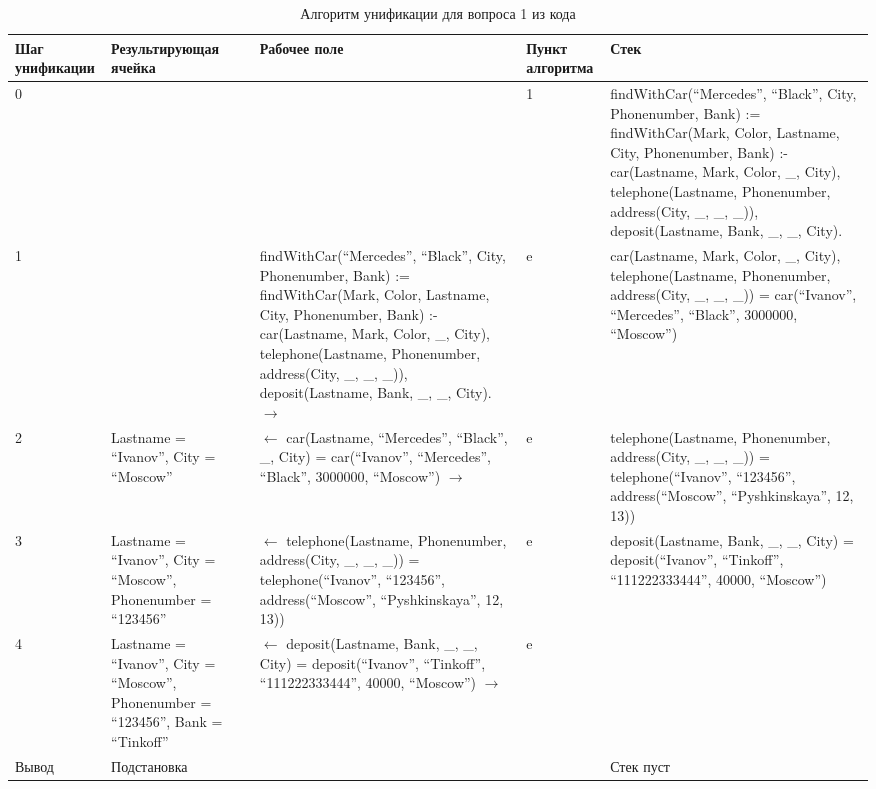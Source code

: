 {
\small
\begin{longtable}{|p{1.15cm}|p{2.5cm}|p{5cm}|p{1cm}|p{7cm}|}
    \caption{Алгоритм унификации для вопроса 1 из кода}\\
    \hline
    Шаг унификации & Резуль\-тирующая ячейка & Рабочее поле & Пункт алгоритма & Стек \\
    \hline
    0 & & & 1 & findWithCar(``Mercedes'', ``Black'', City, Phonenumber, Bank) := findWithCar(Mark, Color, Lastname, City, Phonenumber, Bank) :- car(Lastname, Mark, Color, \_, City), telephone(Lastname, Phonenumber, address(City, \_, \_, \_)), deposit(Lastname, Bank, \_, \_, City). \\
    \hline
    1 & & findWithCar(``Mercedes'', ``Black'', City, Phonenumber, Bank) := findWithCar(Mark, Color, Lastname, City, Phonenumber, Bank) :- car(Lastname, Mark, Color, \_, City), telephone(Lastname, Phonenumber, address(City, \_, \_, \_)), deposit(Lastname, Bank, \_, \_, City). $\longrightarrow$ & e & car(Lastname, Mark, Color, \_, City), telephone(Lastname, Phonenumber, address(City, \_, \_, \_)) = car(``Ivanov'', ``Mercedes'', ``Black'', 3000000, ``Moscow'') \\
    \hline
    2 & Lastname = ``Ivanov'', City = ``Moscow'' & $\longleftarrow$ car(Lastname, ``Mercedes'', ``Black'', \_, City) = car(``Ivanov'', ``Mercedes'', ``Black'', 3000000, ``Moscow'') $\longrightarrow$ & e & telephone(Lastname, Phonenumber, address(City, \_, \_, \_)) = telephone(``Ivanov'', ``123456'', address(``Moscow'', ``Pyshkinskaya'', 12, 13)) \\
    \hline
    3 & Lastname = ``Ivanov'', City = ``Moscow'', Phonenumber = ``123456'' & $\longleftarrow$ telephone(Lastname, Phonenumber, address(City, \_, \_, \_)) = telephone(``Ivanov'', ``123456'', address(``Moscow'', ``Pyshkinskaya'', 12, 13)) & e & deposit(Lastname, Bank, \_, \_, City) = deposit(``Ivanov'', ``Tinkoff'', ``111222333444'', 40000, ``Moscow'') \\
    \hline
    4 & Lastname = ``Ivanov'', City = ``Moscow'', Phonenumber = ``123456'', Bank = ``Tinkoff'' & $\longleftarrow$ deposit(Lastname, Bank, \_, \_, City) = deposit(``Ivanov'', ``Tinkoff'', ``111222333444'', 40000, ``Moscow'') $\longrightarrow$ & e & \\
    \hline
    Вывод & Подстановка & & & Стек пуст \\
    \hline
\end{longtable}
}
